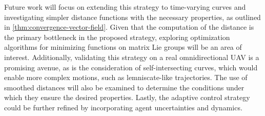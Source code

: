 Future work will focus on extending this strategy to time-varying curves and investigating simpler distance functions with the necessary properties, as outlined in \cref{thm:convergence-vector-field}. Given that the computation of the distance is the primary bottleneck in the proposed strategy, exploring optimization algorithms for minimizing functions on matrix Lie groups will be an area of interest. Additionally, validating this strategy on a real omnidirectional UAV is a promising avenue, as is the consideration of self-intersecting curves, which would enable more complex motions, such as lemniscate-like trajectories. The use of smoothed distances will also be examined to determine the conditions under which they ensure the desired properties. Lastly, the adaptive control strategy could be further refined by incorporating agent uncertainties and dynamics.